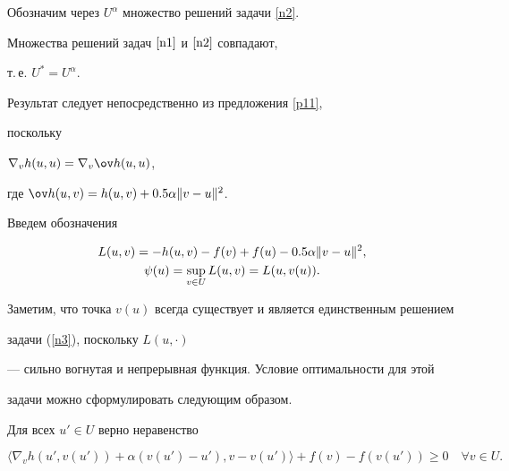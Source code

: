 Обозначим через $U^\alpha$ множество решений задачи \ref{n2}.





\begin{props}\label{p12} 


Множества решений задач $\ref{n1}$ и $\ref{n2}$ совпадают,


т.\,е. $U^* = U^\alpha$.


\end{props}





\begin{pf}


Результат следует непосредственно из предложения \ref{p11}, 


поскольку \linebreak


$\nabla_v h(u,u) = \nabla_v \ov h(u,u)$,


где $\ov h(u,v) = h(u,v) + 0.5 \alpha \|v-u\|^2$.


\end{pf}





Введем обозначения


\begin{gather}


L(u,v) = - h(u,v) - f(v) + f(u) - 0.5 \alpha \|v-u\|^2, \notag \\


\label{n3}


\psi(u)= \sup \limits_{v \in U} L(u,v) = L(u, v(u)). 


\end{gather}


Заметим, что точка $v(u)$ всегда существует и является единственным решением


задачи (\ref{n3}), поскольку $L(u,\cdot)$


--- сильно вогнутая и непрерывная функция. Условие оптимальности для этой 


задачи можно сформулировать следующим образом.





\begin{props}\label{p13}


Для всех $u' \in U$ верно неравенство


\begin{equation}\label{n3a}


\langle \nabla_v h(u',v(u')) + \alpha (v(u') - u'), v - v(u') \rangle +


f(v) - f(v(u')) \ge 0 \quad \forall v \in U.


\end{equation}


\end{props}





